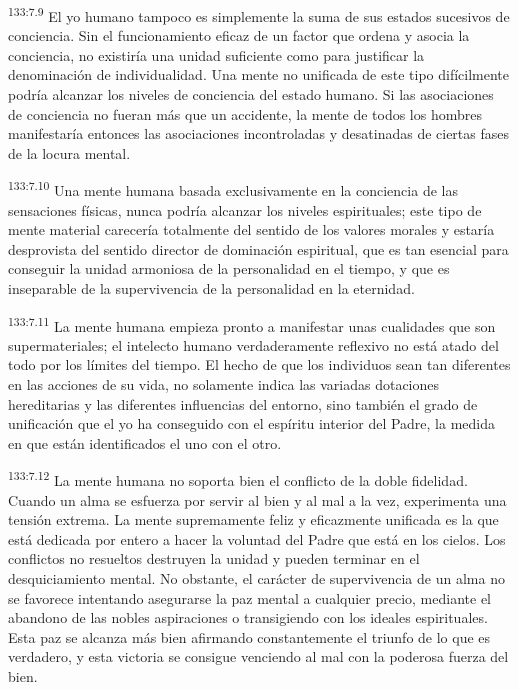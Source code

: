\par
\textsuperscript{133:7.9} El yo humano tampoco es simplemente la suma de sus estados sucesivos de conciencia. Sin el funcionamiento eficaz de un factor que ordena y asocia la conciencia, no existiría una unidad suficiente como para justificar la denominación de individualidad. Una mente no unificada de este tipo difícilmente podría alcanzar los niveles de conciencia del estado humano. Si las asociaciones de conciencia no fueran más que un accidente, la mente de todos los hombres manifestaría entonces las asociaciones incontroladas y desatinadas de ciertas fases de la locura mental.

\par
\textsuperscript{133:7.10} Una mente humana basada exclusivamente en la conciencia de las sensaciones físicas, nunca podría alcanzar los niveles espirituales; este tipo de mente material carecería totalmente del sentido de los valores morales y estaría desprovista del sentido director de dominación espiritual, que es tan esencial para conseguir la unidad armoniosa de la personalidad en el tiempo, y que es inseparable de la supervivencia de la personalidad en la eternidad.

\par
\textsuperscript{133:7.11} La mente humana empieza pronto a manifestar unas cualidades que son supermateriales; el intelecto humano verdaderamente reflexivo no está atado del todo por los límites del tiempo. El hecho de que los individuos sean tan diferentes en las acciones de su vida, no solamente indica las variadas dotaciones hereditarias y las diferentes influencias del entorno, sino también el grado de unificación que el yo ha conseguido con el espíritu interior del Padre, la medida en que están identificados el uno con el otro.

\par
\textsuperscript{133:7.12} La mente humana no soporta bien el conflicto de la doble fidelidad. Cuando un alma se esfuerza por servir al bien y al mal a la vez, experimenta una tensión extrema. La mente supremamente feliz y eficazmente unificada es la que está dedicada por entero a hacer la voluntad del Padre que está en los cielos. Los conflictos no resueltos destruyen la unidad y pueden terminar en el desquiciamiento mental. No obstante, el carácter de supervivencia de un alma no se favorece intentando asegurarse la paz mental a cualquier precio, mediante el abandono de las nobles aspiraciones o transigiendo con los ideales espirituales. Esta paz se alcanza más bien afirmando constantemente el triunfo de lo que es verdadero, y esta victoria se consigue venciendo al mal con la poderosa fuerza del bien.

